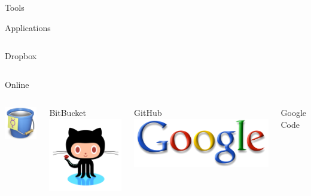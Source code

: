 \begin{frame}{Tools}
\begin{block}{Applications}
\begin{columns}[c]
            Dropbox
        \end{columns}
    \end{block}
    \begin{block}{Online}
        \begin{columns}[c] %
            \centering
            \includegraphics[width=0.4\linewidth]{img/bitbucket.png}

            BitBucket
            \centering
            \includegraphics[width=0.4\linewidth]{img/github.png}

            GitHub
            \vspace{0.4cm}
            \centering
            \includegraphics[width=0.6\linewidth]{img/googlecode.png}

            Google Code
        \end{columns}
    \end{block}
\end{frame}
